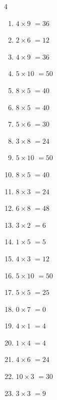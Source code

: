 \begin{multicols}{4}
\begin{enumerate}
  \item $4\times 9$
        $=36$

  \item $2\times 6$
        $=12$

  \item $4\times 9$
        $=36$

  \item $5\times 10$
        $=50$

  \item $8\times 5$
        $=40$

  \item $8\times 5$
        $=40$

  \item $5\times 6$
        $=30$

  \item $3\times 8$
        $=24$

  \item $5\times 10$
        $=50$

  \item $8\times 5$
        $=40$

  \item $8\times 3$
        $=24$

  \item $6\times 8$
        $=48$

  \item $3\times 2$
        $=6$

  \item $1\times 5$
        $=5$

  \item $4\times 3$
        $=12$

\columnbreak %

  \item $5\times 10$
        $=50$

  \item $5\times 5$
        $=25$

  \item $0\times 7$
        $=0$

  \item $4\times 1$
        $=4$

  \item $1\times 4$
        $=4$

  \item $4\times 6$
        $=24$

  \item $10\times 3$
        $=30$

  \item $3\times 3$
        $=9$


\end{enumerate}
\end{multicols}

